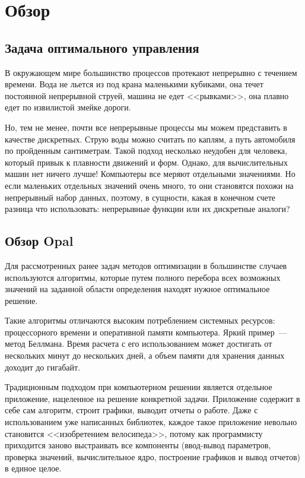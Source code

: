 \chapter{Обзор}

\section{Задача оптимального управления}

В окружающем мире большинство процессов протекают непрерывно с течением времени. Вода не льется из под крана маленькими кубиками, она течет постоянной непрерывной струей, машина не едет <<рывками>>, она плавно едет по извилистой змейке дороги.

Но, тем не менее, почти все непрерывные процессы мы можем представить в качестве дискретных. Струю воды можно считать по каплям, а путь автомобиля по пройденным сантиметрам. Такой подход несколько неудобен для человека, который привык к плавности движений и форм. Однако, для вычислительных машин нет ничего лучше! Компьютеры все меряют отдельными значениями. Но если маленьких отдельных значений очень много, то они становятся похожи на непрерывный набор данных, поэтому, в сущности, какая в конечном счете разница что использовать: непрерывные функции или их дискретные аналоги?

\section{Обзор Opal}

Для рассмотренных ранее задач методов оптимизации в большинстве случаев используются алгоритмы, которые путем полного перебора всех возможных значений на заданной области определения находят нужное оптимальное решение.

Такие алгоритмы отличаются высоким потреблением системных ресурсов: процессорного времени и оперативной памяти компьютера. Яркий пример~--- метод Беллмана. Время расчета с его использованием может достигать от нескольких минут до нескольких дней, а объем памяти для хранения данных доходит до гигабайт.

Традиционным подходом при компьютерном решении является отдельное приложение, нацеленное на решение конкретной задачи. Приложение содержит в себе сам алгоритм, строит графики, выводит отчеты о работе. Даже с использованием уже написанных библиотек, каждое такое приложение невольно становится <<изобретением велосипеда>>, потому как программисту приходится заново выстраивать все компоненты (ввод-вывод параметров, проверка значений, вычислительное ядро, построение графиков и вывод отчетов) в единое целое. 

